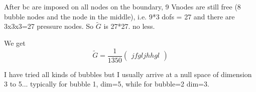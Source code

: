 After bc are imposed on all nodes on the boundary, 
9 Vnodes are still free (8 bubble nodes and the node in the 
middle), i.e. 9*3 dofs = 27 and there are
3x3x3=27 pressure nodes. So $\tilde{G}$ is 27*27. no less. 

We get 
\[
\tilde{G} =
\frac{1}{1350}
\left(
\begin{array}{ccccccccccccccccccccccccccc}
jfg ljh hg l
\end{array}
\right)
\]

I have tried all kinds of bubbles but I usually arrive at a
null space of dimension 3 to 5... typically for bubble 1, dim=5, 
while for bubble=2 dim=3. 











